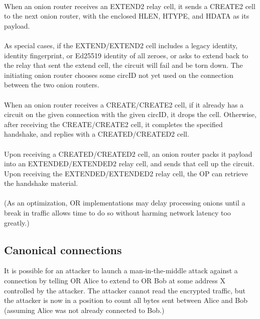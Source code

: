 \paragraph{}
When an onion router receives an EXTEND2 relay cell, it sends a CREATE2
cell to the next onion router, with the enclosed HLEN, HTYPE, and HDATA
as its payload.

\paragraph{}
As special cases, if the EXTEND/EXTEND2 cell includes a legacy
identity, identity fingerprint, or Ed25519 identity of all zeroes, or
asks to extend back to the relay that sent the extend cell, the
circuit will fail and be torn down. The initiating onion router
chooses some circID not yet used on the connection between the two
onion routers.

\paragraph{}
When an onion router receives a CREATE/CREATE2 cell, if it already has a
circuit on the given connection with the given circID, it drops the
cell. Otherwise, after receiving the CREATE/CREATE2 cell, it completes
the specified handshake, and replies with a CREATED/CREATED2 cell.

\paragraph{}
Upon receiving a CREATED/CREATED2 cell, an onion router packs it payload
into an EXTENDED/EXTENDED2 relay cell, and sends
that cell up the circuit. Upon receiving the EXTENDED/EXTENDED2 relay
cell, the OP can retrieve the handshake material.

\paragraph{}
(As an optimization, OR implementations may delay processing onions
until a break in traffic allows time to do so without harming
network latency too greatly.)


\subsection{Canonical connections}
It is possible for an attacker to launch a man-in-the-middle attack
against a connection by telling OR Alice to extend to OR Bob at some
address X controlled by the attacker. The attacker cannot read the
encrypted traffic, but the attacker is now in a position to count all
bytes sent between Alice and Bob (assuming Alice was not already
connected to Bob.)

